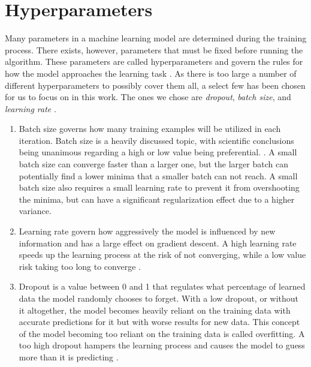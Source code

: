 \documentclass[nofilelist]{cslthse-msc}
\begin{document}
\section{Hyperparameters}
\label{sect:hyper}
Many parameters in a machine learning model are determined during the training process. There exists, however, parameters that must be fixed before running the algorithm. These parameters are called hyperparameters and govern the rules for how the model approaches the learning task \citep{weerts2020importance}. As there is too large a number of different hyperparameters to possibly cover them all, a select few has been chosen for us to focus on in this work. The ones we chose are \textit{dropout}, \textit{batch size}, and \textit{learning rate} \citep{hyperparameters}.

\begin{enumerate}
    \item  Batch size governs how many training examples will be utilized in each iteration. Batch size is a heavily discussed topic, with scientific conclusions being unanimous regarding a high or low value being preferential. \citep{KANDEL2020312}. A small batch size can converge faster than a larger one, but the larger batch can potentially find a lower minima that a smaller batch can not reach. A small batch size also requires a small learning rate to prevent it from overshooting the minima, but can have a significant regularization effect due to a higher variance. 
    \item  Learning rate govern how aggressively the model is influenced by new information and has a large effect on gradient descent. A high learning rate speeds up the learning process at the risk of not converging, while a low value risk taking too long to converge \citep{learning_rate}.  %
     \item Dropout is a value between 0 and 1 that regulates what percentage of learned data the model randomly chooses to forget. With a low dropout, or without it altogether, the model becomes heavily reliant on the training data with accurate predictions for it but with worse results for new data. This concept of the model becoming too reliant on the training data is called overfitting. A too high dropout hampers the learning process and causes the model to guess more than it is predicting \citep{dropout}.
\end{enumerate}



\end{document}
